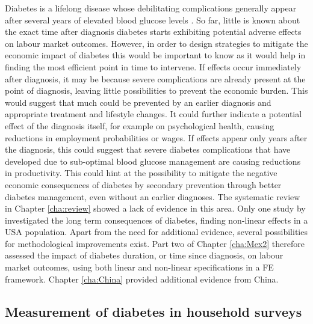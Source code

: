 Diabetes is a lifelong disease whose debilitating complications generally appear after several years of elevated blood glucose levels \parencite{WorldHealthOrganization2016}. So far, little is known about the exact time after diagnosis diabetes starts exhibiting potential adverse effects on labour market outcomes. However, in order to design strategies to mitigate the economic impact of diabetes this would be important to know as it would help in finding the most efficient point in time to intervene. If effects occur immediately after diagnosis, it may be because severe complications are already present at the point of diagnosis, leaving little possibilities to prevent the economic burden. This would suggest that much could be prevented by an earlier diagnosis and appropriate treatment and lifestyle changes. It could further indicate a potential effect of the diagnosis itself, for example on psychological health, causing reductions in employment probabilities or wages. If effects appear only years after the diagnosis, this could suggest that severe diabetes complications that have developed due to sub-optimal blood glucose management are causing reductions in productivity. This could hint at the possibility to mitigate the negative economic consequences of diabetes by secondary prevention through better diabetes management, even without an earlier diagnoses. The systematic review in Chapter \ref{cha:review} showed a lack of evidence in this area. Only one study by \textcite{Minor2013} investigated the long term consequences of diabetes, finding non-linear effects in a USA population. Apart from the need for additional evidence, several possibilities for methodological improvements exist. Part two of Chapter \ref{cha:Mex2} therefore assessed the impact of diabetes duration, or time since diagnosis, on labour market outcomes, using both linear and non-linear specifications in a \ac{FE} framework. Chapter \ref{cha:China} provided additional evidence from China.

\subsection{Measurement of diabetes in household surveys}

